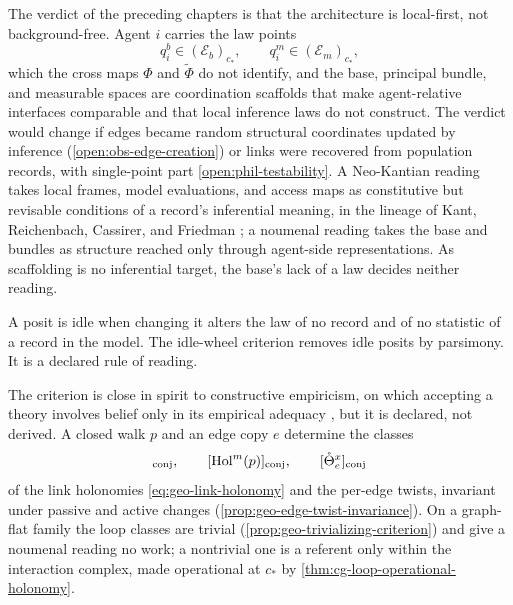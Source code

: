 The verdict of the preceding chapters is that the architecture is local-first,
not background-free. Agent \(i\) carries the law points
\begin{equation}
q_i^b\in(\mathcal E_b)_{c_*},
\qquad
q_i^m\in(\mathcal E_m)_{c_*},
\label{eq:phil-fiber-measures}
\end{equation}
which the cross maps \(\Phi\) and \(\widetilde\Phi\) do not identify, and the
base, principal bundle, and measurable spaces are coordination scaffolds that
make agent-relative interfaces comparable and that local inference laws do not
construct. The verdict would change if edges became random structural
coordinates updated by inference (\cref{open:obs-edge-creation}) or links were
recovered from population records, with single-point part
\cref{open:phil-testability}. A Neo-Kantian reading takes local frames, model
evaluations, and access maps as constitutive but revisable conditions of a
record's inferential meaning, in the lineage of Kant, Reichenbach, Cassirer, and
Friedman \citep{Kant1781,Reichenbach1965,Cassirer1923,Friedman2001}; a noumenal
reading takes the base and bundles as structure reached only through
agent-side representations. As scaffolding is no inferential target, the
base's lack of a law decides neither reading.

A posit is idle when changing it alters the law of no record and of no
statistic of a record in the model. The idle-wheel criterion removes idle
posits by parsimony. It is a declared rule of reading.

The criterion is close in spirit to constructive empiricism, on which accepting
a theory involves belief only in its empirical adequacy
\citep[11--12]{vanFraassen1980}, but it is declared, not derived. A closed walk
\(p\) and an edge copy \(e\) determine the classes
\begin{equation}
[\mathrm{Hol}^b(p)]_{\rm conj},
\qquad
[\mathrm{Hol}^m(p)]_{\rm conj},
\qquad
[\mathring\Theta^x_e]_{\rm conj}
\label{eq:phil-holonomy}
\end{equation}
of the link holonomies \eqref{eq:geo-link-holonomy} and the per-edge twists,
invariant under passive and active changes
(\cref{prop:geo-edge-twist-invariance}). On a graph-flat family the loop classes
are trivial (\cref{prop:geo-trivializing-criterion}) and give a noumenal reading
no work; a nontrivial one is a referent only within the interaction complex,
made operational at \(c_*\) by \cref{thm:cg-loop-operational-holonomy}.

